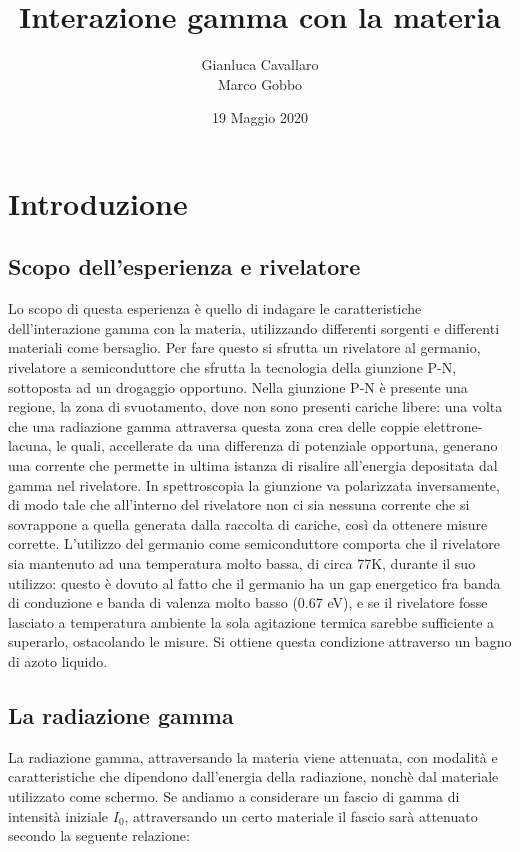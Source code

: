 \documentclass[a4paper,10pt]{article}
\title{Interazione gamma con la materia}
\author{Gianluca Cavallaro \\ Marco Gobbo}
\date{19 Maggio 2020}
\begin{document}
\maketitle


\section{Introduzione}
\subsection{Scopo dell'esperienza e rivelatore}
Lo scopo di questa esperienza \`e quello di indagare le caratteristiche dell'interazione gamma con la materia, utilizzando differenti sorgenti e differenti materiali come bersaglio. Per fare questo si sfrutta un rivelatore al germanio, rivelatore a semiconduttore che sfrutta la tecnologia della giunzione P-N, sottoposta ad un drogaggio opportuno. Nella giunzione P-N \`e presente una regione, la zona di svuotamento, dove non sono presenti cariche libere: una volta che una radiazione gamma attraversa questa zona crea delle coppie elettrone-lacuna, le quali, accellerate da una differenza di potenziale opportuna, generano una corrente che permette in ultima istanza di risalire all'energia depositata dal gamma nel rivelatore. In spettroscopia la giunzione va polarizzata inversamente, di modo tale che all'interno del rivelatore non ci sia nessuna corrente che si sovrappone a quella generata dalla raccolta di cariche, cos\`i da ottenere misure corrette. L'utilizzo del germanio come semiconduttore comporta che il rivelatore sia mantenuto ad una temperatura molto bassa, di circa 77K, durante il suo utilizzo: questo \`e dovuto al fatto che il germanio ha un gap energetico fra banda di conduzione e banda di valenza molto basso (0.67 eV), e se il rivelatore fosse lasciato a temperatura ambiente la sola agitazione termica sarebbe sufficiente a superarlo, ostacolando le misure. Si ottiene questa condizione attraverso un bagno di azoto liquido.

\subsection{La radiazione gamma}
\noindent La radiazione gamma, attraversando la materia viene attenuata, con modalit\`a e caratteristiche che dipendono dall'energia della radiazione, nonch\`e dal materiale utilizzato come schermo. Se andiamo a considerare un fascio di gamma di intensità iniziale $I_0$, attraversando un certo materiale il fascio sarà attenuato secondo la seguente relazione:
\end{document}
